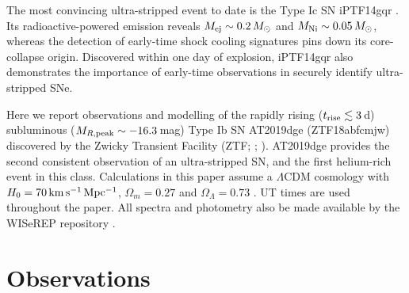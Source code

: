 \documentclass[twocolumn]{aastex63}
\begin{document}
\begin{CJK*}{UTF8}{gbsn}
The most convincing ultra-stripped event to date is the Type Ic SN iPTF14gqr \citep{De2018}. Its 
radioactive-powered emission reveals $M_{\rm ej}\sim 0.2\, M_\odot$ and $M_{\rm Ni}\sim 
0.05\,M_\odot$, whereas the detection of early-time shock cooling signatures pins down its 
core-collapse origin. Discovered within one day of explosion, iPTF14gqr also demonstrates the 
importance of early-time observations in securely identify ultra-stripped SNe. 

Here we report observations and modelling of the rapidly rising ($t_{\rm rise}\lesssim3$\,d) 
subluminous ($M_{R\rm , peak} \sim -16.3$\,mag) Type Ib SN AT2019dge (ZTF18abfcmjw) discovered 
by the Zwicky Transient Facility (ZTF; \citealt{Bellm2019b};  \citealt{Graham2019}). AT2019dge provides 
the second consistent observation of an ultra-stripped SN, and the first helium-rich event in this class. 
Calculations in this paper assume a $\Lambda$CDM cosmology with $H_0= 70 \, \rm km \, s^{-1}\, 
Mpc^{-1}$, $\Omega_m = 0.27$ and $\Omega_{\Lambda} = 0.73$ \citep{Komatsu2011}. UT times are 
used throughout the paper. 
All spectra and photometry also be made available by the WISeREP repository \citep{Yaron2012}.

\section{Observations} 

\end{CJK*}
\end{document}
